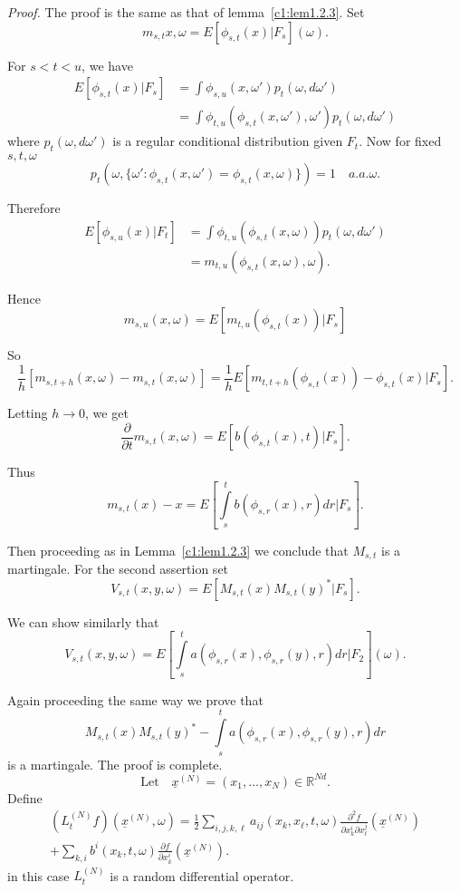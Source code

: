 \noindent \textit{Proof.}
The proof is the same as that of lemma~\ref{c1:lem1.2.3}. Set
\begin{equation*}
  m_{s,t}{{x,\omega}} = E [\phi_{s,t}(x)|F_s](\omega).\tag*{$\Box$}
\end{equation*}

For $s < t < u$, we have
\begin{align*}
  E [\phi_{s,t}(x)|F_s] & = \int \phi_{s,u}{{(x,\omega')}} p_t
  (\omega, d \omega')\\ 
  & =  \int \phi_{t,u} (\phi_{s,t} (x,\omega'),\omega') p_t (\omega, d \omega')
\end{align*}
where $p_t (\omega, d \omega')$ is a regular conditional distribution
given $F_t$. Now for fixed $s,t,\omega$ 
$$
p_t (\omega, \{ \omega':  \phi_{s,t}{{(x,\omega')}} = 
\phi_{s,t} (x,\omega) \}) = 1  \quad a.a.\omega. 
$$

Therefore
\begin{align*}
  E [\phi_{s,u}{{(x)}}|F_t] & = \int
  \phi_{t,u}{{(\phi_{s,t}{{(x,\omega)}})}} p_t (\omega, d \omega')\\ 
  & = m_{t,u}{{(\phi_{s,t}{{(x,\omega),\omega}})}}. 
\end{align*}


Hence
$$
m_{s,u}{{(x,\omega)}} = E [m_{t,u} {{(\phi_{s,t}{{(x)}})}}|F_s]
$$

So
$$
\frac{1}{h} [m_{s,t+h} {{(x,\omega)}}- m_{s,t}{{(x, \omega)}}] = 
\frac{1}{h} E [m_{t,t+h} {{(\phi_{s,t}{{(x)}})}} - \phi_{s,t} (x) | F_s]. 
$$

Letting $h \to 0$, we get
$$
\frac{\partial}{\partial t} m_{s,t}{{(x,\omega)}} = 
E[b(\phi_{s,t}(x),t)|F_s]. 
$$

Thus\pageoriginale
$$
m_{s,t}{{(x)}}-x = E \left[\int\limits_s^t b (\phi_{s,r}(x), 
        r)dr|F_s\right]. 
$$

Then proceeding as in Lemma~\ref{c1:lem1.2.3} we conclude that $M_{s,t}$ is a
martingale. For the second assertion set 
$$
V_{s,t}{{(x,y,\omega)}} = E [M_{s,t} {{(x)}} M_{s,t}{{(y)^*}}|F_s].
$$

We can show similarly that 
$$
V_{s,t}{{(x,y,\omega)}} = E\left[\int\limits_s^t a
  (\phi_{s,r}{{(x)}}, \phi_{s,r}(y),r) dr|F_2\right] (\omega).  
$$

Again proceeding the same way we prove that 
 $$
 M_{s,t}{{(x)}}  M_{s,t}{{(y)^*}}  - \int\limits_s^t a
 (\phi_{s,r}{{(x)}}, \phi_{s,r}(y),r)dr 
 $$
 is a martingale. The proof is complete.
$$
\text{Let} \quad \underline{x}^{(N)} = (x_1,\ldots,x_N) \in
\mathbb{R}^{Nd}. 
$$
Define 
\begin{multline*}
  (L_t^{(N)} f ) (\underline{x}^{(N)},\omega) = \frac{1}{2}
  \sum\limits_{i,j,k,\ell} a_{ij}(x_k,x_\ell,t,\omega) \frac{\partial^2
    f}{\partial x^i_k \partial x^j_\ell} (\underline{x}^{(N)})\\ 
  +  \sum_{k,i} b^i (x_k,t,\omega) \frac{\partial f}{\partial x^i_k}
  (\underline{x}^{(N)}). \tag{2.1.7}\label{c2:eq2.1.7} 
\end{multline*}
in this case $L_t^{(N)}$ is a random differential operator.

